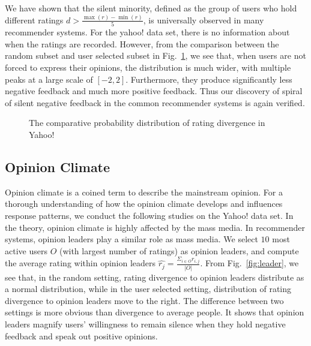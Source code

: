 \documentclass{sig-alternate}
\begin{document}
We have shown that the silent minority, defined as the group of users who hold different ratings $d>\frac{\max(r)-\min(r)}{5}$, is universally observed in many recommender systems. For the yahoo! data set, there is no information about when the ratings are recorded. However, from the comparison between the random subset and user selected subset in Fig.~\ref{fig:yahoo}, we see that, when users are not forced to express their opinions, the distribution is much wider, with multiple peaks at a large scale of $[-2,2]$. Furthermore, they produce significantly less negative feedback and much more positive feedback. Thus our discovery of spiral of silent negative feedback in the common recommender systems is again verified.

\begin{figure}[htbp]
\centering
\centering
{}
\caption{The comparative probability distribution of rating divergence in Yahoo!}\label{fig:yahoo}
\end{figure}

\subsection{Opinion Climate}
Opinion climate is a coined term to describe the mainstream opinion. For a thorough understanding of how the opinion climate develops and influences response patterns, we conduct the following studies on the Yahoo! data set.
In the theory, opinion climate is highly affected by the mass media. In recommender systems, opinion leaders play a similar role as mass media. We select $10$ most active users $O$ (with largest number of ratings) as opinion leaders, and compute the average rating within opinion leaders $\hat{r_j}=\frac{\Sigma_{i\in O}r_{i,j}}{|O|}$. From Fig.~\ref{fig:leader}, we see that, in the random setting, rating divergence to opinion leaders distribute as a normal distribution, while in the user selected setting, distribution of rating divergence to opinion leaders move to the right. The difference between two settings is more obvious than divergence to average people. It shows that opinion leaders magnify users' willingness to remain silence when they hold negative feedback and speak out positive opinions.
\end{document}
